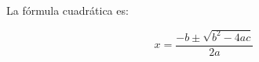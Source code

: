 \documentclass{article}
\begin{document}
La fórmula cuadrática es:

\begin{equation}
x = \frac{-b \pm \sqrt{b^2 - 4ac}}{2a}
\end{equation}
\end{document}

